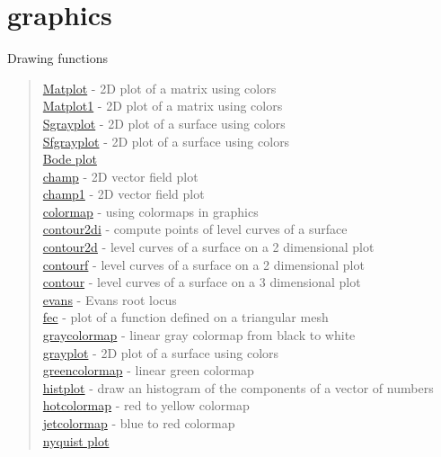 \chapter*{graphics}

Drawing functions
\begin{quote}
\noindent
\hyperlink{Matplot}{Matplot} - 2D plot of a matrix using colors\\
\hyperlink{Matplot1}{Matplot1} - 2D plot of a matrix using colors \\
\hyperlink{Sgrayplot}{Sgrayplot} - 2D plot of a surface using colors \\
\hyperlink{Sfgrayplot}{Sfgrayplot} - 2D plot of a surface using colors \\
\hyperlink{bode}{Bode plot}\\
\hyperlink{champ}{champ} - 2D vector field plot \\
\hyperlink{champ1}{champ1} - 2D vector field plot \\
\hyperlink{colormap}{colormap} - using colormaps in graphics\\
\hyperlink{contour2di}{contour2di} - compute points of level curves of a surface\\
\hyperlink{contour2d}{contour2d} - level curves of a surface on a 2 dimensional plot\\
\hyperlink{contourf}{contourf}  - level curves of a surface on a 2 dimensional plot\\
\hyperlink{contour}{contour}  - level curves of a surface on a 3 dimensional plot\\
\hyperlink{evans}{evans} - Evans root locus\\
\hyperlink{fec}{fec} -  plot of a function defined on a triangular mesh\\
\hyperlink{graycolormap}{graycolormap} - linear gray colormap from black to white\\
\hyperlink{grayplot}{grayplot} - 2D plot of a surface using colors \\
\hyperlink{greencolormap}{greencolormap} - linear green colormap\\
\hyperlink{histplot}{histplot} - draw an histogram of the components of a vector of numbers\\
\hyperlink{hotcolormap}{hotcolormap} - red to yellow colormap\\
\hyperlink{jetcolormap}{jetcolormap} - blue to red colormap \\
\hyperlink{nyquist}{nyquist plot}\\

\end{quote}
